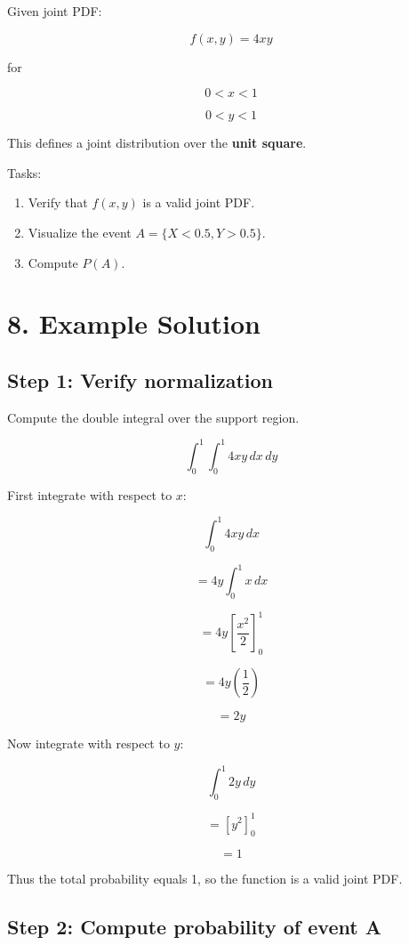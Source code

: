 \documentclass{article}
\begin{document}
Given joint PDF:

\[
f(x, y) = 4xy
\]

for

\[
0 < x < 1
\]

\[
0 < y < 1
\]

This defines a joint distribution over the \textbf{unit square}.

Tasks:

\begin{enumerate}
\item Verify that $f(x,y)$ is a valid joint PDF.
\item Visualize the event $A = \{X < 0.5, Y > 0.5\}$.
\item Compute $P(A)$.
\end{enumerate}

\bigskip

\section*{8. Example Solution}

\subsection*{Step 1: Verify normalization}

Compute the double integral over the support region.

\[
\int_{0}^{1} \int_{0}^{1} 4xy \, dx \, dy
\]

First integrate with respect to $x$:

\[
\int_{0}^{1} 4xy \, dx
\]

\[
= 4y \int_{0}^{1} x \, dx
\]

\[
= 4y \left[\frac{x^{2}}{2}\right]_{0}^{1}
\]

\[
= 4y \left(\frac{1}{2}\right)
\]

\[
= 2y
\]

Now integrate with respect to $y$:

\[
\int_{0}^{1} 2y \, dy
\]

\[
= \left[y^{2}\right]_{0}^{1}
\]

\[
= 1
\]

Thus the total probability equals 1, so the function is a valid joint PDF.

\bigskip

\subsection*{Step 2: Compute probability of event A}
\end{document}
